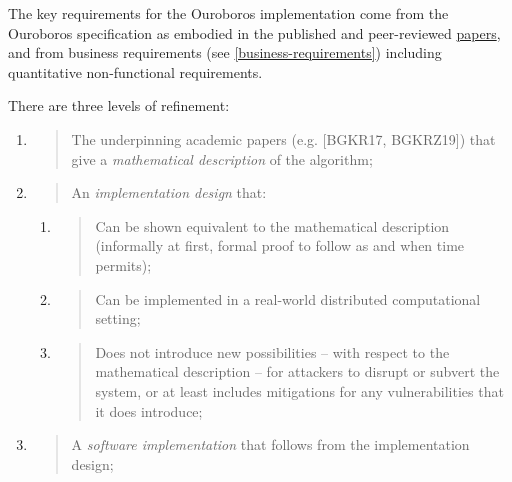 \documentclass[11pt,a4paper]{article}
\begin{document}
The key requirements for the Ouroboros implementation come from the
Ouroboros specification as embodied in the published and peer-reviewed
\href{https://iohk.io/research/papers/}{{papers}}, and from business
requirements (see \cref{business-requirements})
including quantitative non-functional requirements.

There are three levels of refinement:

\begin{enumerate}
\def\labelenumi{\arabic{enumi}.}
\item
  \begin{quote}
  The underpinning academic papers (e.g. {[}BGKR17, BGKRZ19{]}) that
  give a \emph{mathematical description} of the algorithm;
  \end{quote}
\item
  \begin{quote}
  An \emph{implementation design} that:
  \end{quote}

  \begin{enumerate}
  \def\labelenumii{\alph{enumii}.}
  \item
    \begin{quote}
    Can be shown equivalent to the mathematical description (informally
    at first, formal proof to follow as and when time permits);
    \end{quote}
  \item
    \begin{quote}
    Can be implemented in a real-world distributed computational
    setting;
    \end{quote}
  \item
    \begin{quote}
    Does not introduce new possibilities -- with respect to the
    mathematical description -- for attackers to disrupt or subvert the
    system, or at least includes mitigations for any vulnerabilities
    that it does introduce;
    \end{quote}
  \end{enumerate}
\item
  \begin{quote}
  A \emph{software implementation} that follows from the implementation
  design;
  \end{quote}


\end{enumerate}
\end{document}
